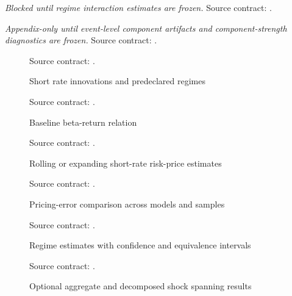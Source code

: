 \begin{table}[htbp]
\centering
\caption{Monetary-regime interaction and stability results}
\emph{Blocked until regime interaction estimates are frozen.}
\smallskip
\small Source contract: .
\end{table}

\begin{table}[htbp]
\centering
\caption{Optional policy-information decomposition}
\emph{Appendix-only until event-level component artifacts and component-strength diagnostics are frozen.}
\smallskip
\small Source contract: .
\end{table}

\begin{figure}[htbp]
\centering
{}
\caption{Short rate innovations and predeclared regimes}
\small Source contract: .
\end{figure}

\begin{figure}[htbp]
\centering
{}
\caption{Baseline beta-return relation}
\small Source contract: .
\end{figure}

\begin{figure}[htbp]
\centering
{}
\caption{Rolling or expanding short-rate risk-price estimates}
\small Source contract: .
\end{figure}

\begin{figure}[htbp]
\centering
{}
\caption{Pricing-error comparison across models and samples}
\small Source contract: .
\end{figure}

\begin{figure}[htbp]
\centering
{}
\caption{Regime estimates with confidence and equivalence intervals}
\small Source contract: .
\end{figure}

\begin{figure}[htbp]
\centering
{}
\caption{Optional aggregate and decomposed shock spanning results}
\small Source contract: .
\end{figure}
